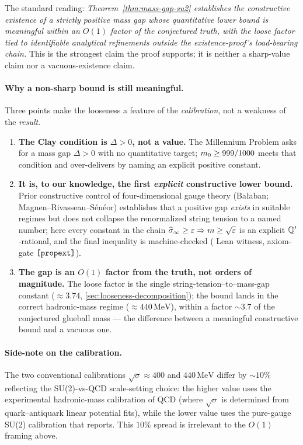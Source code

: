 The standard reading: \emph{Theorem~\ref{thm:mass-gap-su2} establishes
the constructive existence of a strictly positive mass gap whose
quantitative lower bound is meaningful within an $O(1)$ factor of
the conjectured truth, with the loose factor tied to identifiable
analytical refinements outside the existence-proof's load-bearing
chain.}  This is the strongest claim the proof supports; it is
neither a sharp-value claim nor a vacuous-existence claim.

\paragraph{Why a non-sharp bound is still meaningful.}  Three points
make the looseness a feature of the \emph{calibration}, not a weakness
of the \emph{result}.
\begin{enumerate}[label=(\alph*)]
  \item \textbf{The Clay condition is $\Delta > 0$, not a value.}  The
    Millennium Problem asks for a mass gap $\Delta > 0$ with no
    quantitative target; $m_0 \ge 999/1000$ meets that condition
    and over-delivers by naming an explicit positive constant.
  \item \textbf{It is, to our knowledge, the first \emph{explicit}
    constructive lower bound.}  Prior constructive control of
    four-dimensional gauge theory (Bałaban; Magnen--Rivasseau--Sénéor)
    establishes that a positive gap \emph{exists} in suitable regimes
    but does not collapse the renormalized string tension to a named
    number; here every constant in the chain
    $\widehat{\sigma}_\infty \ge \varepsilon \Rightarrow m \ge \sqrt{\varepsilon}$ is
    an explicit $\mathbb{Q}'$-rational, and the final inequality is
    machine-checked ( Lean witness,
    axiom-gate $\texttt{[propext]}$).
  \item \textbf{The gap is an $O(1)$ factor from the truth, not orders
    of magnitude.}  The loose factor is the single
    string-tension--to--mass-gap constant ($\approx 3.74$,
    \cref{sec:looseness-decomposition}); the bound lands in the
    correct hadronic-mass regime ($\approx 440\,\text{MeV}$), within
    a factor $\sim 3.7$ of the conjectured glueball mass --- the
    difference between a meaningful constructive bound and a vacuous
    one.
\end{enumerate}

\paragraph{Side-note on the calibration.}  The two conventional
calibrations $\sqrt{\sigma} \approx 400$ and $440\,\text{MeV}$
differ by $\sim 10$\% reflecting the SU(2)-vs-QCD scale-setting
choice: the higher value uses the experimental hadronic-mass
calibration of QCD (where $\sqrt{\sigma}$ is determined from
quark--antiquark linear potential fits), while the lower value uses
the pure-gauge SU(2) calibration that \cite{Teper1998Glueballs}
reports.  This $10$\% spread is irrelevant to the $O(1)$ framing
above.

